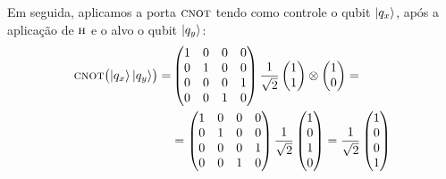 Em seguida, aplicamos a porta \(\operatorname{\textsc{cnot}}\) tendo como controle o qubit $\ket{q_x}$, após a aplicação de \(\operatorname{\textsc{h}}\) e o alvo o qubit $\ket{q_y}$:
\begin{equation}\label{eq:matrizbell00}
	\begin{split}
 		\CNOT \bigl( \ket{q_x}\ket{q_y} \bigr) =& 
		\begin{pmatrix}
		1 & 0 & 0 & 0 \\
		0 & 1 & 0 & 0 \\
		0 & 0 & 0 & 1 \\
		0 & 0 & 1 & 0
		\end{pmatrix} 
		\frac{1}{\sqrt{2}} \begin{pmatrix*}[r]
		1 \\
		1
		\end{pmatrix*} \otimes  \begin{pmatrix*}[r]
		1 \\
		0
		\end{pmatrix*} = \\
		&= \begin{pmatrix}
		1 & 0 & 0 & 0 \\
		0 & 1 & 0 & 0 \\
		0 & 0 & 0 & 1 \\
		0 & 0 & 1 & 0
		\end{pmatrix} \frac{1}{\sqrt{2}}\begin{pmatrix}
		1 \\
		0 \\
		1 \\
		0
		\end{pmatrix} = \frac{1}{\sqrt{2}} \begin{pmatrix}
		1 \\
		0 \\
		0 \\
		1
		\end{pmatrix}
	\end{split}	
\end{equation}

